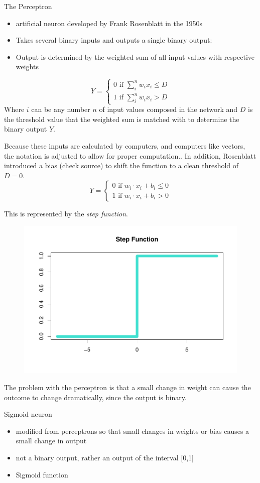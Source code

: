 The Perceptron

\begin{itemize}
\tightlist
\item
  artificial neuron developed by Frank Rosenblatt in the 1950s
  \cite{nielsen}
\item
  Takes several binary inputs and outputs a single binary output:
\item
  Output is determined by the weighted sum of all input values with
  respective weights
\end{itemize}

\[
Y = 
\begin{cases}
0 \text{ if } \sum_i^n w_ix_i \le D \\
1 \text{ if } \sum_i^n w_ix_i > D
\end{cases}
\] Where \(i\) can be any number \(n\) of input values composed in the
network and \(D\) is the threshold value that the weighted sum is
matched with to determine the binary output \(Y\).

Because these inputs are calculated by computers, and computers like
vectors, the notation is adjusted to allow for proper computation.. In
addition, Rosenblatt introduced a bias (check source) to shift the
function to a clean threshold of \(D = 0\). \[
Y = 
\begin{cases}
0 \text{ if } w_i \cdot x_i + b_i \le 0 \\
1 \text{ if } w_i \cdot x_i + b_i > 0
\end{cases}
\]

This is represented by the \emph{step function}.

\begin{figure}
    \centering
    \includegraphics[width = .4\textwidth]{Figures/step-function-1.pdf}
\end{figure}

The problem with the perceptron is that a small change in weight can
cause the outcome to change dramatically, since the output is binary.

Sigmoid neuron

\begin{itemize}
\tightlist
\item
  modified from perceptrons so that small changes in weights or bias
  causes a small change in output
\item
  not a binary output, rather an output of the interval {[}0,1{]}
\item
  Sigmoid function
\end{itemize}

